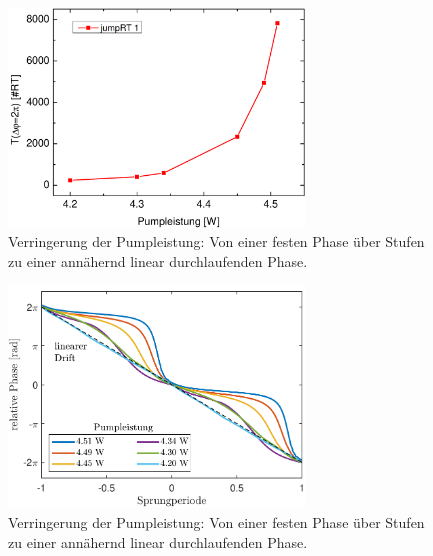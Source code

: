 \documentclass[bachelor,       %
               twoside,        %
               BCOR10mm,       %
               english,ngerman, %
               ]{GAUBM}
\begin{document}
\begin{figure}
	\centering
	\includegraphics[width=0.7\textwidth]{figures/jumpRT.pdf}
	\caption{Verringerung der Pumpleistung: Von einer festen Phase über Stufen zu einer annähernd linear durchlaufenden Phase.}
   \label{fig:jumpRT}
\end{figure} 

\begin{figure}
	\centering
	\includegraphics[width=0.7\textwidth]{figures/steps_relativ2.pdf}
	\caption{Verringerung der Pumpleistung: Von einer festen Phase über Stufen zu einer annähernd linear durchlaufenden Phase.}
   \label{fig:165014steps2}
\end{figure}


 
%   
\end{document}

